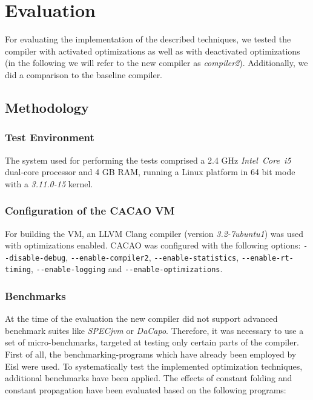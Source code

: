 \section{Evaluation}
\label{sec:evaluation}

For evaluating the implementation of the described techniques, we tested the compiler with activated optimizations as well as with deactivated optimizations (in the following we will refer to the new compiler as \emph{compiler2}). Additionally, we did a comparison to the baseline compiler. 

\subsection{Methodology}

\subsubsection*{Test Environment}
\label{sec:evaluation:test-environment}

The system used for performing the tests comprised a 2.4 GHz \emph{Intel\textsuperscript{\textregistered}~Core\textsuperscript{\texttrademark}~i5} dual-core processor and 4 GB RAM, running a Linux platform in 64 bit mode with a \emph{3.11.0-15} kernel.

\subsubsection*{Configuration of the CACAO VM}
\label{sec:evaluation:configuration}

For building the VM, an LLVM Clang compiler (version \emph{3.2-7ubuntu1}) was used with optimizations enabled. CACAO was configured with the following options: \verb|--disable-debug|, \verb|--enable-compiler2|, \verb|--enable-statistics|, \verb|--enable-rt-timing|, \verb|--enable-logging| and \verb|--enable-optimizations|. 

\subsubsection*{Benchmarks}
\label{sec:evaluation:benchmarks}

At the time of the evaluation the new compiler did not support advanced benchmark suites like \emph{SPECjvm} or \emph{DaCapo}. Therefore, it was necessary to use a set of micro-benchmarks, targeted at testing only certain parts of the compiler. First of all, the benchmarking-programs which have already been employed by Eisl \cite{eisl:2013} were used. To systematically test the implemented optimization techniques, additional benchmarks have been applied.
The effects of constant folding and constant propagation have been evaluated based on the following programs:

